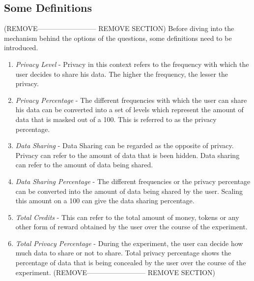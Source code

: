 \subsection{Some Definitions}
(REMOVE-------------------------- REMOVE SECTION)
Before diving into the mechanism behind the options of the questions, some definitions need to be introduced.
\begin{enumerate}
\item {\it Privacy Level} - Privacy in this context refers to the frequency with which the user decides to share his data. The higher the frequency, the lesser the privacy.
\item {\it Privacy Percentage} - The different frequencies with which the user can share his data can be converted into a set of levels which represent
the amount of data that is masked out of a 100. This is referred to as the privacy percentage.
\item {\it Data Sharing} - Data Sharing can be regarded as the opposite of privacy. Privacy can refer to the amount of data that is been hidden. Data sharing can refer to
the amount of data being shared.
\item {\it Data Sharing Percentage} - The different frequencies or the privacy percentage can be converted into the amount of data being shared by the user. Scaling
this amount on a 100 can give the data sharing percentage.
\item {\it Total Credits} - This can refer to the total amount of money, tokens or any other form of reward obtained by the user over the course of the experiment.
\item {\it Total Privacy Percentage} - During the experiment, the user can decide how much data to share or not to share. Total privacy percentage shows the percentage of data that
is being concealed by the user over the course of the experiment.
(REMOVE-------------------------- REMOVE SECTION)
\end{enumerate}

